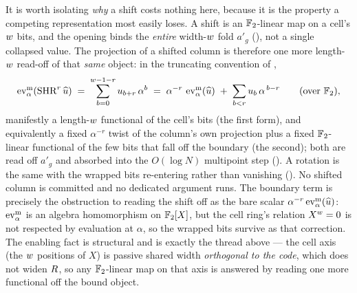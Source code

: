 \begin{remark}
\label{rem:shift-readoff}
It is worth isolating \emph{why} a shift costs nothing here, because it is the
property a competing representation most easily loses. A shift is an
$\mathbb{F}_2$-linear map on a cell's $w$ bits, and the opening binds the
\emph{entire} width-$w$ fold $a'_g$ (), not a single
collapsed value. The projection of a shifted column is therefore one more
length-$w$ read-off of that \emph{same} object: in the truncating
convention of ,
\[
  \operatorname{ev}^{\mathrm{m}}_{\alpha}(\operatorname{SHR}^{r}\widehat{u})
  \;=\; \sum_{b=0}^{w-1-r} u_{b+r}\,\alpha^{b}
  \;=\; \alpha^{-r}\,\operatorname{ev}^{\mathrm{m}}_{\alpha}(\widehat{u}) \;+\; \sum_{b<r} u_b\,\alpha^{\,b-r}
  \qquad(\text{over }\mathbb{F}_2),
\]
manifestly a length-$w$ functional of the cell's bits (the first form), and
equivalently a fixed $\alpha^{-r}$ twist of the column's own projection plus a
fixed $\mathbb{F}_2$-linear functional of the few bits that fall off the boundary (the
second); both are read off $a'_g$ and absorbed into the $O(\log N)$ multipoint
step (). A rotation is the same with the wrapped bits
re-entering rather than vanishing (). No shifted column is
committed and no dedicated argument runs. The boundary term is precisely the
obstruction to reading the shift off as the bare scalar $\alpha^{-r}\operatorname{ev}^{\mathrm{m}}_{\alpha}(\widehat{u})$:
$\operatorname{ev}^{\mathrm{m}}_{\alpha}$ is an algebra homomorphism on $\mathbb{F}_2[X]$, but the cell ring's relation
$X^{w}=0$ is not respected by evaluation at $\alpha$, so the wrapped bits
survive as that correction. The enabling fact is structural and is exactly the
thread above --- the cell axis (the $w$ positions of $X$) is passive shared
width \emph{orthogonal to the code}, which does not widen $R$, so any
$\mathbb{F}_2$-linear map on that axis is answered by reading one more functional off
the bound object.


\end{remark}
